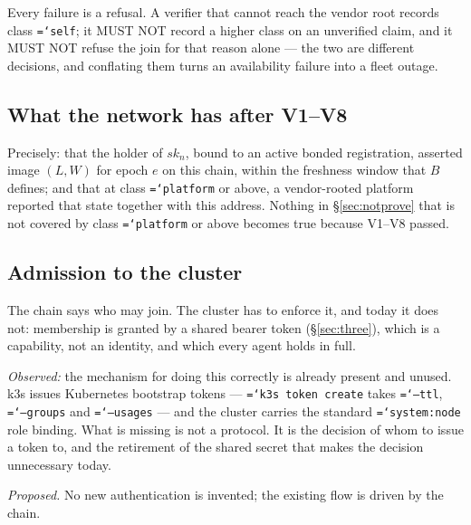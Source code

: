 \documentclass[11pt,a4paper]{article}
\newcommand{\code}[1]{\texttt{\hyphenchar\font=`\-\relax #1}}
\begin{document}
Every failure is a refusal. A verifier that cannot reach the vendor root records
class \code{self}; it MUST NOT record a higher class on an unverified claim, and
it MUST NOT refuse the join for that reason alone --- the two are different
decisions, and conflating them turns an availability failure into a fleet outage.

\subsection{What the network has after V1--V8}

Precisely: that the holder of $sk_n$, bound to an active bonded registration,
asserted image $(L, W)$ for epoch $e$ on this chain, within the freshness window
that $B$ defines; and that at class \code{platform} or above, a vendor-rooted
platform reported that state together with this address. Nothing in
\S\ref{sec:notprove} that is not covered by class \code{platform} or above becomes
true because V1--V8 passed.

\subsection{Admission to the cluster}
\label{sec:admit}

The chain says who may join. The cluster has to enforce it, and today it does not:
membership is granted by a shared bearer token (\S\ref{sec:three}), which is a
capability, not an identity, and which every agent holds in full.

\emph{Observed:} the mechanism for doing this correctly is already present and
unused. k3s issues Kubernetes bootstrap tokens --- \code{k3s token create} takes
\code{--ttl}, \code{--groups} and \code{--usages} --- and the cluster carries the
standard \code{system:node} role binding. What is missing is not a protocol. It is
the decision of whom to issue a token to, and the retirement of the shared secret
that makes the decision unnecessary today.

\emph{Proposed.} No new authentication is invented; the existing flow is driven by
the chain.
\end{document}
